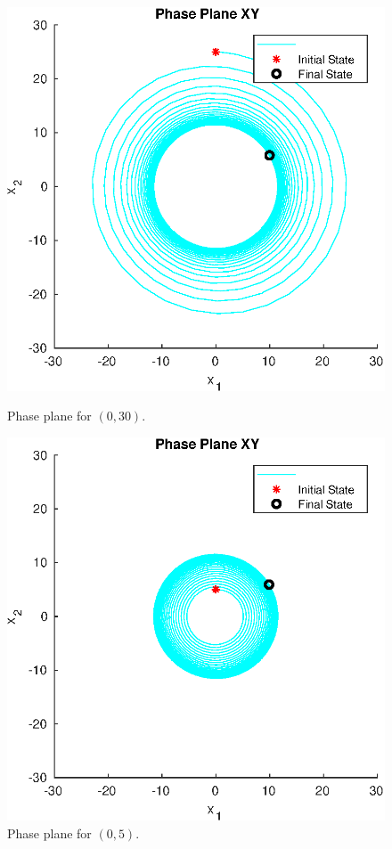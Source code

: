 \documentclass[a4paper,10pt]{article}
\begin{document}
\begin{figure}[H]
 \begin{minipage}{.5\textwidth}
  \centering
  \includegraphics[width=.8\linewidth]{question2a.eps}
  \caption{Phase plane for $(0,30)$.} \label{fig:q2a}
 \end{minipage}
 \begin{minipage}{.5\textwidth}
  \centering
  \includegraphics[width=.8\linewidth]{question2b.eps}
  \caption{Phase plane for $(0,5)$.} \label{fig:q2b}
 \end{minipage}
\end{figure}
\end{document}
